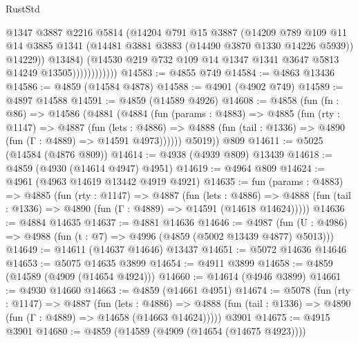 \begin{lexlean}{RustStd}
\begin{coremodule}
                            @1347
                            @3887
                            @2216
                            @5814
                            (@14204
                              @791
                              @15
                              @3887
                              (@14209
                                @789
                                @109
                                @11
                                @14
                                @3885
                                @1341
                                (@14481 @3881 @3883 (@14490 @3870 @1330 @14226 @5939))
                                @14229))
                            @13484)
                          (@14530
                            @219
                            @732
                            @109
                            @14
                            @1347
                            @1341
                            @3647
                            @5813
                            @14249
                            @13505))))))))))))
@14583 := @4855 @749
@14584 := @4863 @13436
@14586 := @4859 (@14584 @4878)
@14588 := @4901 (@4902 @749)
@14589 := @4897 @14588
@14591 := @4859 (@14589 @4926)
@14608 := @4858
    (fun (fn : @86) =>
    @14586
      (@4881
        (@4884
          (fun (params : @4883) =>
          @4885
            (fun (rty : @1147) =>
            @4887
              (fun (lets : @4886) =>
              @4888 (fun (tail : @1336) => @4890 (fun (Γ : @4889) => @14591 @4973))))))
        @5019))
    @809
@14611 := @5025 (@14584 (@4876 @809))
@14614 := @4938 (@4939 @809) @13439
@14618 := @4859 (@4930 (@14614 @4947) @4951)
@14619 := @4964 @809
@14624 := @4961 (@4963 @14619 @13442 @4919 @4921)
@14635 := fun (params : @4883) =>
  @4885
    (fun (rty : @1147) =>
    @4887
      (fun (lets : @4886) =>
      @4888 (fun (tail : @1336) => @4890 (fun (Γ : @4889) => @14591 (@14618 @14624)))))
@14636 := @4884 @14635
@14637 := @4881 @14636
@14646 := @4987
    (fun (U : @4986) => @4988 (fun (t : @7) => @4996 (@4859 (@5002 @13439 @4877) @5013)))
@14649 := @14611 (@14637 @14646) @13437
@14651 := @5072 @14636 @14646
@14653 := @5075 @14635 @3899
@14654 := @4911 @3899
@14658 := @4859 (@14589 (@4909 (@14654 @4924)))
@14660 := @14614 (@4946 @3899)
@14661 := @4930 @14660
@14663 := @4859 (@14661 @4951)
@14674 := @5078
    (fun (rty : @1147) =>
    @4887
      (fun (lets : @4886) =>
      @4888 (fun (tail : @1336) => @4890 (fun (Γ : @4889) => @14658 (@14663 @14624)))))
    @3901
@14675 := @4915 @3901
@14680 := @4859 (@14589 (@4909 (@14654 (@14675 @4923))))

\end{coremodule}
\end{lexlean}
